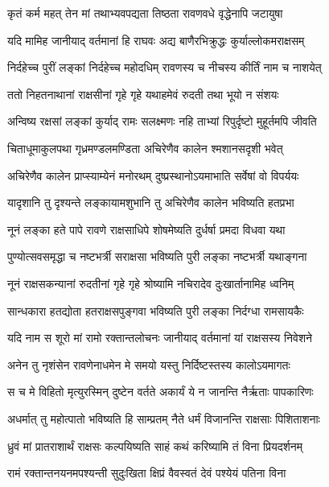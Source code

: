 \twolineshloka
{कृतं कर्म महत् तेन मां तथाभ्यवपद्यता}
{तिष्ठता रावणवधे वृद्धेनापि जटायुषा} %

\twolineshloka
{यदि मामिह जानीयाद् वर्तमानां हि राघवः}
{अद्य बाणैरभिक्रुद्धः कुर्याल्लोकमराक्षसम्} %

\twolineshloka
{निर्दहेच्च पुरीं लङ्कां निर्दहेच्च महोदधिम्}
{रावणस्य च नीचस्य कीर्तिं नाम च नाशयेत्} %

\twolineshloka
{ततो निहतनाथानां राक्षसीनां गृहे गृहे}
{यथाहमेवं रुदती तथा भूयो न संशयः} %

\twolineshloka
{अन्विष्य रक्षसां लङ्कां कुर्याद् रामः सलक्ष्मणः}
{नहि ताभ्यां रिपुर्दृष्टो मुहूर्तमपि जीवति} %

\twolineshloka
{चिताधूमाकुलपथा गृध्रमण्डलमण्डिता}
{अचिरेणैव कालेन श्मशानसदृशी भवेत्} %

\twolineshloka
{अचिरेणैव कालेन प्राप्स्याम्येनं मनोरथम्}
{दुष्प्रस्थानोऽयमाभाति सर्वेषां वो विपर्ययः} %

\twolineshloka
{यादृशानि तु दृश्यन्ते लङ्कायामशुभानि तु}
{अचिरेणैव कालेन भविष्यति हतप्रभा} %

\twolineshloka
{नूनं लङ्का हते पापे रावणे राक्षसाधिपे}
{शोषमेष्यति दुर्धर्षा प्रमदा विधवा यथा} %

\twolineshloka
{पुण्योत्सवसमृद्धा च नष्टभर्त्री सराक्षसा}
{भविष्यति पुरी लङ्का नष्टभर्त्री यथाङ्गना} %

\twolineshloka
{नूनं राक्षसकन्यानां रुदतीनां गृहे गृहे}
{श्रोष्यामि नचिरादेव दुःखार्तानामिह ध्वनिम्} %

\twolineshloka
{सान्धकारा हतद्योता हतराक्षसपुङ्गवा}
{भविष्यति पुरी लङ्का निर्दग्धा रामसायकैः} %

\twolineshloka
{यदि नाम स शूरो मां रामो रक्तान्तलोचनः}
{जानीयाद् वर्तमानां यां राक्षसस्य निवेशने} %

\twolineshloka
{अनेन तु नृशंसेन रावणेनाधमेन मे}
{समयो यस्तु निर्दिष्टस्तस्य कालोऽयमागतः} %

\twolineshloka
{स च मे विहितो मृत्युरस्मिन् दुष्टेन वर्तते}
{अकार्यं ये न जानन्ति नैर्ऋताः पापकारिणः} %

\twolineshloka
{अधर्मात् तु महोत्पातो भविष्यति हि साम्प्रतम्}
{नैते धर्मं विजानन्ति राक्षसाः पिशिताशनाः} %

\twolineshloka
{ध्रुवं मां प्रातराशार्थं राक्षसः कल्पयिष्यति}
{साहं कथं करिष्यामि तं विना प्रियदर्शनम्} %

\twolineshloka
{रामं रक्तान्तनयनमपश्यन्ती सुदुःखिता}
{क्षिप्रं वैवस्वतं देवं पश्येयं पतिना विना} %


